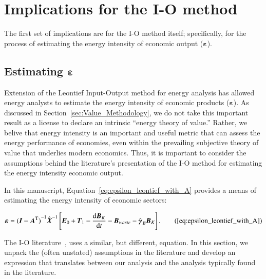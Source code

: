 \section{Implications for the I-O method}
\label{sec:Implications_for_IO}

The first set of implications are for the I-O method itself;
specifically, for the process of estimating
the energy intensity of economic output ($\boldsymbol{\varepsilon}$).


\subsection{Estimating $\boldsymbol{\varepsilon}$}
\label{sec:estimating_epsilon-implications_chapter}

Extension of the Leontief 
Input-Output method
for energy analysis has allowed energy analysts to estimate 
the energy intensity
of economic products ($\boldsymbol{\varepsilon}$). 
As discussed in Section~\ref{sec:Value_Methodology},
we do not take this important result as a license
to declare an intrinsic ``energy theory of value.''
Rather, we belive that energy intensity is an 
important and useful metric that can assess 
the energy performance of economies,
even within the prevailing subjective theory of value
that underlies modern economics. 
Thus, it is important to consider the assumptions behind
the literature's presentation of the I-O method 
for estimating the energy intensity economic output.

In this manuscript, Equation~\ref{eq:epsilon_leontief_with_A} 
provides a means of estimating the energy intensity of economic sectors:

\begin{equation}
	\boldsymbol{\varepsilon} 
	= {(\vec{I} - \vec{A}^{\mathrm{T}})}^{-1}\hat{\vec{X}}^{-1}
		\left[\vec{E}_{0} 
				+ \vec{T}_{1} 
				- \frac{\mathrm{d}\vec{B}_{K}}{\mathrm{d}t} 
				- \vec{B}_{waste}
				- \hat{\boldsymbol{\gamma}}_{B}\vec{B}_{K}
		\right].\tag{\ref{eq:epsilon_leontief_with_A}}
\end{equation}

\noindent{}The I-O literature~\cite{Bullard1975,Casler1984}, 
uses a similar, but different, equation. 
In this section, we unpack the (often unstated) assumptions in the literature
and develop an expression that translates
between our analysis and the analysis typically found in the literature. 

